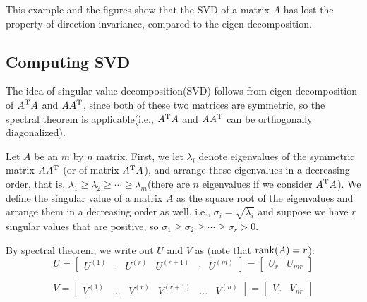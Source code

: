 This example and the figures show that the SVD of a matrix $A$ has lost the property of direction invariance, compared to the eigen-decomposition.



\vspace{2cm}
\subsection{Computing SVD}
The idea of singular value decomposition(SVD) follows from eigen decomposition of $A^{{\rm T}}A$ and $AA^{{\rm T}}$, since both of these two matrices are symmetric, so the spectral theorem is applicable(i.e., $A^{{\rm T}}A$ and $AA^{{\rm T}}$ can be orthogonally diagonalized). 

Let $A$ be an $m$ by $n$ matrix. First, we let $\lambda_i$ denote eigenvalues of the symmetric matrix $A A^{{\rm T}}$ (or of matrix $A^{{\rm T}} A$), and arrange these eigenvalues in a decreasing order, that is, $\lambda_1\geq \lambda_2\geq \cdots \geq \lambda_m$(there are $n$ eigenvalues if we consider $A^{{\rm T}}A$). We define the singular value of a matrix $A$ as the square root of the eigenvalues and arrange them in a decreasing order as well, i.e., $\sigma_i=\sqrt{\lambda_i}$ and suppose we have $r$ singular values that are positive, so $\sigma_1\geq \sigma_2\geq \cdots \geq \sigma_r>0$.


By spectral theorem, we write out $U$ and $V$ as (note that $\operatorname{rank}(A)=r$):
$$ U =   
\left[
\begin{matrix}
U^{(1)} & \cdot & U^{(r)} & U^{(r+1)} & \cdot & U^{(m)}
\end{matrix}
\right] =
\left[
\begin{matrix}
U_r & U_{mr}
\end{matrix}
\right]
$$

$$ V =   
\left[
\begin{matrix}
V^{(1)} & ... & V^{(r)} & V^{(r+1)} & ... & V^{(n)}
\end{matrix}
\right] =
\left[
\begin{matrix}
V_r & V_{nr}
\end{matrix}
\right]
$$


